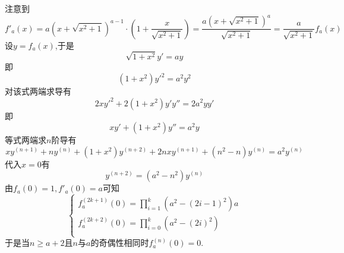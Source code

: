 \documentclass{ctexart}
\begin{document}
\begin{solution}[Solution.]
    注意到$$f'_a(x)=a\left(x+\sqrt{x^2+1}\right)^{a-1}\cdot\left(1+\dfrac{x}{\sqrt{x^2+1}}\right)=\dfrac{a\left(x+\sqrt{x^2+1}\right)^a}{\sqrt{x^2+1}}=\dfrac{a}{\sqrt{x^2+1}}f_a(x)$$
    设$y=f_a(x)$,于是$$\sqrt{1+x^2}y'=ay$$
    即$$\left(1+x^2\right)y'^2=a^2y^2$$
    对该式两端求导有$$2xy'^2+2\left(1+x^2\right)y'y''=2a^2yy'$$
    即$$xy'+\left(1+x^2\right)y''=a^2y$$
    等式两端求$n$阶导有$$xy^{(n+1)}+ny^{(n)}+\left(1+x^2\right)y^{(n+2)}+2nxy^{(n+1)}+\left(n^2-n\right)y^{(n)}=a^2y^{(n)}$$
    代入$x=0$有$$y^{(n+2)}=\left(a^2-n^2\right)y^{(n)}$$
    由$f_a(0)=1,f'_a(0)=a$可知
    $$\left\{\begin{array}{l}
        f_a^{(2k+1)}(0)=\prod_{i=1}^{k}\left(a^2-\left(2i-1\right)^2\right)a \\
        f_a^{(2k+2)}(0)=\prod_{i=0}^{k}\left(a^2-\left(2i\right)^2\right) \\
    \end{array}\right.$$
    于是当$n\geqslant a+2$且$n$与$a$的奇偶性相同时$f_a^{(n)}(0)=0$.
\end{solution}
\end{document}
